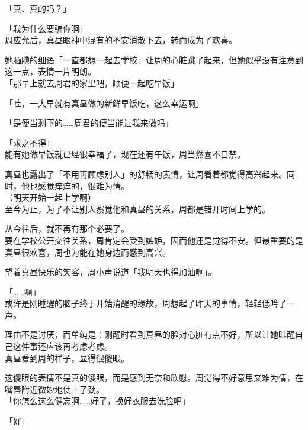 「真、真的吗？」

「我为什么要骗你啊」\\

周应允后，真昼眼神中混有的不安消散下去，转而成为了欢喜。

她腼腆的细语「一直都想一起去学校」让周的心脏跳了起来，但她似乎没有注意到这一点，表情一片明朗。\\

「那早上就去周君的家里吧，顺便一起吃早饭」

「哇，一大早就有真昼做的新鲜早饭吃，这么幸运啊」

「是便当剩下的……周君的便当能让我来做吗」

「求之不得」\\

能有她做早饭就已经很幸福了，现在还有午饭，周当然喜不自禁。

真昼也露出了「不用再顾虑别人」的舒畅的表情，让周看着都觉得高兴起来。同时，他也感觉痒痒的，很难为情。\\

（明天开始一起上学啊）\\

至今为止，为了不让别人察觉他和真昼的关系，周都是错开时间上学的。

从今往后，就不再有那个必要了。\\

要在学校公开交往关系，周肯定会受到嫉妒，因而他还是觉得不安。但最重要的是真昼很欢喜，周也为能在她身边而感到高兴。

望着真昼快乐的笑容，周小声说道「我明天也得加油啊」。\\

\vspace{2\baselineskip}

「……啊」\\

或许是刚睡醒的脑子终于开始清醒的缘故，周想起了昨天的事情，轻轻低吟了一声。

理由不是讨厌，而单纯是：刚醒时看到真昼的脸对心脏有点不好，所以让她叫醒自己这件事还应该再考虑考虑。\\

真昼看到周的样子，显得很傻眼。

这傻眼的表情不是真的傻眼，而是感到无奈和欣慰。周觉得不好意思又难为情，在嘴唇附近微妙地使上了劲。\\

「你怎么这么健忘啊……好了，换好衣服去洗脸吧」

「好」\\

